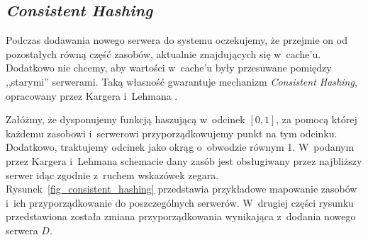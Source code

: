 \documentclass[a4paper,11pt]{scrartcl}
\newcommand{\s}{ }
\newcommand{\keszu}{cache'u}
\begin{document}
\subsection{\textit{Consistent Hashing}}
\label{sect_consistent_hashing}
Podczas dodawania nowego serwera do systemu oczekujemy, że przejmie on od pozostałych równą część zasobów, aktualnie znajdujących się w~\keszu. Dodatkowo nie chcemy, aby wartości w~\keszu\s były przesuwane pomiędzy ,,starymi'' serwerami. Taką własność gwarantuje mechanizm \textit{Consistent Hashing}, opracowany przez Kargera i~Lehmana \cite{karger1997consistent}.

Załóżmy, że dysponujemy funkcją haszującą w~odcinek $[0, 1]$, za pomocą której każdemu zasobowi i~serwerowi przyporządkowujemy punkt na tym odcinku. Dodatkowo, traktujemy odcinek jako okrąg o~obwodzie równym 1. W~podanym przez Kargera i~Lehmana schemacie dany zasób jest obsługiwany przez najbliższy serwer idąc zgodnie z~ruchem wskazówek zegara. Rysunek~\ref{fig_consistent_hashing} przedstawia przykładowe mapowanie zasobów i~ich przyporządkowanie do poszczególnych serwerów. W~drugiej części rysunku przedstawiona została zmiana przyporządkowania wynikająca z~dodania nowego serwera $D$.
\end{document}
